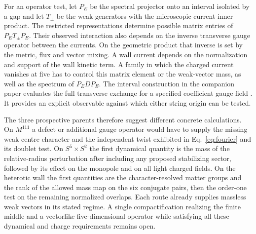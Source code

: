 \documentclass[aps,prd,reprint,onecolumn,nofootinbib,amsmath,amssymb]{revtex4-2}
\begin{document}
For an operator test, let $P_E$ be the spectral projector onto an interval isolated by a gap and let $T_\pm$ be the weak generators with the microscopic current inner product. The restricted representations determine possible matrix entries of $P_E T_\pm P_E$. Their observed interaction also depends on the inverse transverse gauge operator between the currents. On the geometric product that inverse is set by the metric, flux and vector mixing. A wall current depends on the normalization and support of the wall kinetic term. A family in which the charged current vanishes at five has to control this matrix element or the weak-vector mass, as well as the spectrum of $P_E D P_E$. The interval construction in the companion paper evaluates the full transverse exchange for a specified coefficient gauge field \cite{TwoEndpoint2026}. It provides an explicit observable against which either string origin can be tested.

The three prospective parents therefore suggest different concrete calculations. On $M^{111}$ a defect or additional gauge operator would have to supply the missing weak centre character and the independent twist exhibited in Eq.~\eqref{eq:fourier} and its doublet test. On $S^5\times S^2$ the first dynamical quantity is the mass of the relative-radius perturbation after including any proposed stabilizing sector, followed by its effect on the monopole and on all light charged fields. On the heterotic wall the first quantities are the character-resolved matter groups and the rank of the allowed mass map on the six conjugate pairs, then the order-one test on the remaining normalized overlaps. Each route already supplies massless weak vectors in its stated regime. A single compactification realizing the finite middle and a vectorlike five-dimensional operator while satisfying all these dynamical and charge requirements remains open.
\end{document}
